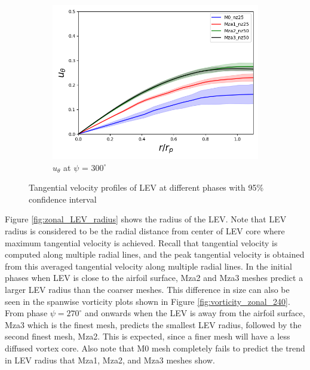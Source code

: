 \begin{figure}[H]
\begin{subfigure}[b]{0.475\textwidth}
	\centering
	\includegraphics[width=1\textwidth]{figures/zonal_adapt_results/LEV/u_theta/phase_300.png}
	\caption{ $u_\theta$ at $\psi$ = $300^\circ$}
	\label{fig:zonal_utheta_300}
	\end{subfigure}
   	\caption{Tangential velocity profiles of LEV at different phases with 95\% confidence interval}
   	\label{fig:zonal_utheta_LEV}
\end{figure}



Figure \ref{fig:zonal_LEV_radius} shows the radius of the LEV. Note that LEV radius is considered to be the radial distance from center of LEV core where maximum tangential velocity is achieved.
Recall that tangential velocity is computed along multiple radial lines, and the peak tangential velocity is obtained from this averaged tangential velocity along multiple radial lines. 
In the initial phases when LEV is close to the airfoil surface, Mza2 and Mza3 meshes predict a larger LEV radius than the coarser meshes. 
This difference in size can also be seen in the spanwise vorticity plots shown in Figure \ref{fig:vorticity_zonal_240}.
From phase $\psi = 270^\circ$ and onwards when the LEV is away from the airfoil surface, Mza3 which is the finest mesh, predicts the smallest LEV radius, followed by the second finest mesh, Mza2. 
This is expected, since a finer mesh will have a less diffused vortex core. Also note that M0 mesh completely fails to predict the trend in LEV radius that Mza1, Mza2, and Mza3 meshes show.

